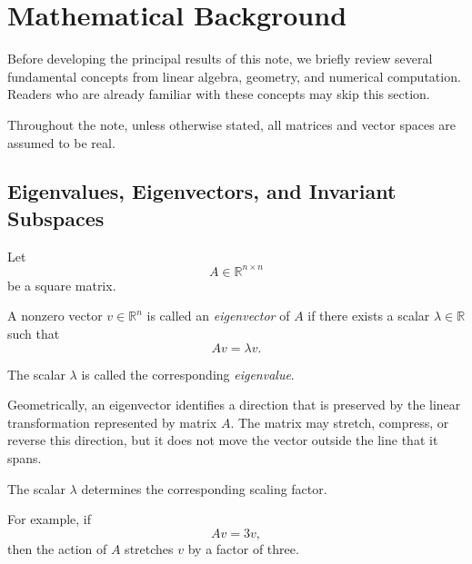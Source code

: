 \documentclass[14pt,letterpaper]{article}
\theoremstyle{plain}
\theoremstyle{definition}
\theoremstyle{remark}
\newcommand{\R}{\mathbb{R}}
\begin{document}

\section{Mathematical Background}
\label{sec:background}

Before developing the principal results of this note,
we briefly review several fundamental concepts from
linear algebra, geometry, and numerical computation.
Readers who are already familiar with these concepts
may skip this section.

Throughout the note, unless otherwise stated, all
matrices and vector spaces are assumed to be real.


\subsection{Eigenvalues, Eigenvectors, and Invariant Subspaces}
\label{subsec:eigen_background}

Let
\[
A\in\R^{n\times n}
\]
be a square matrix.

A nonzero vector $v\in\R^n$ is called an
\emph{eigenvector} of $A$ if there exists a scalar
$\lambda\in\R$ such that
\[
\boxed{Av=\lambda v.}
\]

The scalar $\lambda$ is called the corresponding
\emph{eigenvalue}.

Geometrically, an eigenvector identifies a direction
that is preserved by the linear transformation
represented by matrix $A$. The matrix may stretch, compress,
or reverse this direction, but it does not move the
vector outside the line that it spans.

The scalar $\lambda$ determines the corresponding
scaling factor.

For example, if
\[
Av=3v,
\]
then the action of $A$ stretches $v$ by a factor
of three.
\end{document}
